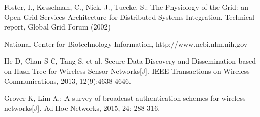 \documentclass{sig-alternate-05-2015}
\begin{document}
\begin{thebibliography}{13}
 Foster, I., Kesselman, C., Nick, J., Tuecke, S.: The Physiology of the
Grid: an Open Grid Services Architecture for Distributed Systems
Integration. Technical report, Global Grid Forum (2002)

 National Center for Biotechnology Information, http://www.ncbi.nlm.nih.gov

He D, Chan S C, Tang S, et al. Secure Data Discovery and Dissemination based on Hash Tree for Wireless Sensor Networks[J]. IEEE Transactions on Wireless Communications, 2013, 12(9):4638-4646.

 Grover K, Lim A.: A survey of broadcast authentication schemes for wireless networks[J]. Ad Hoc Networks, 2015, 24: 288-316.

\end{thebibliography}
\end{document}
